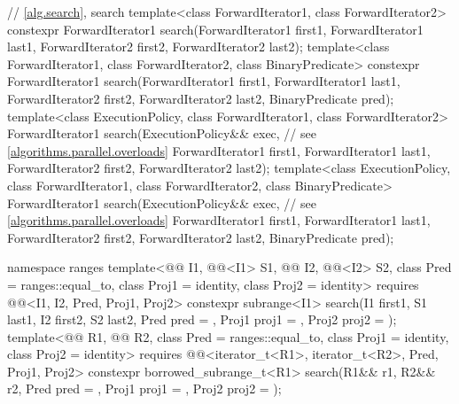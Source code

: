 \begin{codeblock}
{  // \ref{alg.search}, search
  template<class ForwardIterator1, class ForwardIterator2>
    constexpr ForwardIterator1
      search(ForwardIterator1 first1, ForwardIterator1 last1,
             ForwardIterator2 first2, ForwardIterator2 last2);
  template<class ForwardIterator1, class ForwardIterator2, class BinaryPredicate>
    constexpr ForwardIterator1
      search(ForwardIterator1 first1, ForwardIterator1 last1,
             ForwardIterator2 first2, ForwardIterator2 last2,
             BinaryPredicate pred);
  template<class ExecutionPolicy, class ForwardIterator1, class ForwardIterator2>
    ForwardIterator1
      search(ExecutionPolicy&& exec,                            // see \ref{algorithms.parallel.overloads}
             ForwardIterator1 first1, ForwardIterator1 last1,
             ForwardIterator2 first2, ForwardIterator2 last2);
  template<class ExecutionPolicy, class ForwardIterator1, class ForwardIterator2,
           class BinaryPredicate>
    ForwardIterator1
      search(ExecutionPolicy&& exec,                            // see \ref{algorithms.parallel.overloads}
             ForwardIterator1 first1, ForwardIterator1 last1,
             ForwardIterator2 first2, ForwardIterator2 last2,
             BinaryPredicate pred);

  namespace ranges {
    template<@@ I1, @@<I1> S1, @@ I2,
             @@<I2> S2, class Pred = ranges::equal_to,
             class Proj1 = identity, class Proj2 = identity>
      requires @@<I1, I2, Pred, Proj1, Proj2>
      constexpr subrange<I1>
        search(I1 first1, S1 last1, I2 first2, S2 last2, Pred pred = {},
               Proj1 proj1 = {}, Proj2 proj2 = {});
    template<@@ R1, @@ R2, class Pred = ranges::equal_to,
             class Proj1 = identity, class Proj2 = identity>
      requires @@<iterator_t<R1>, iterator_t<R2>, Pred, Proj1, Proj2>
      constexpr borrowed_subrange_t<R1>
        search(R1&& r1, R2&& r2, Pred pred = {},
               Proj1 proj1 = {}, Proj2 proj2 = {});
  }

}
\end{codeblock}

